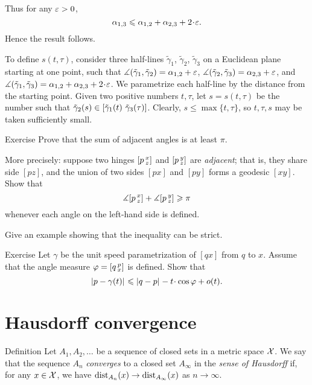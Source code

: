 Thus for any $\varepsilon>0$, 
\[\alpha_{1,3}\le \alpha_{1,2}+\alpha_{2,3}+2\cdot \eps.\]
Hence the result follows.

To define $s(t,\tau)$, consider three half-lines $\tilde \gamma_1$, $\tilde \gamma_2$, $\tilde \gamma_3$ on a Euclidean plane starting at one point, such that
$\measuredangle(\tilde \gamma_1,\tilde \gamma_2)=\alpha_{1,2}+\varepsilon$,
$\measuredangle(\tilde \gamma_2,\tilde \gamma_3)=\alpha_{2,3}+\varepsilon$,
and $\mangle(\tilde \gamma_1,\tilde \gamma_3)\z=\alpha_{1,2}\z+\alpha_{2,3}\z+2\cdot \eps$.
We parametrize each half-line by the distance from the starting point.
Given two positive numbers $t,\tau$, let $s=s(t,\tau)$ be
the number such that 
$\tilde \gamma_2(s)\in[\tilde \gamma_1(t)\ \tilde \gamma_3(\tau)]$. 
Clearly, $s\le\max\{t,\tau\}$, so $t,\tau,s$ may be taken sufficiently small.
\qeds 

\begin{thm}{Exercise}\label{ex:adjacent-angles}
Prove that the sum of adjacent angles is at least $\pi$.

More precisely: suppose two hinges $[p\,{}^{x}_{z}]$ and $[p\,{}^{y}_{z}]$ are \emph{adjacent};
that is, they share side $[pz]$, and the union of two sides $[px]$ and $[py]$ forms a geodesic $[xy]$.
Show that
\[\measuredangle[p\,{}^{x}_{z}]+\measuredangle[p\,{}^{y}_{z}]\geqslant \pi\]
whenever  each angle on the left-hand side is defined.

Give an example showing that the inequality can be strict.
\end{thm}

\begin{thm}{Exercise}\label{ex:first-var}
Let $\gamma$ be the unit speed parametrization of $[qx]$ from $q$ to $x$.
Assume that the angle measure $\varphi=[q\,{}^{p}_{x}]$ is defined.
Show that
\[\dist{p}{\gamma(t)}{}
\le
\dist{q}{p}{}-t\cdot \cos\phi+o(t).\]

\end{thm}

\section{Hausdorff convergence}\label{sec:Hausdorff convergence}

\begin{thm}{Definition}\label{def:gen-Haus-conv}
Let $A_1,A_2,\dots$ be a sequence of closed sets in a metric space $\mathcal{X}$.
We say that the sequence $A_n$ \emph{converges} to a closed set $A_\infty$ in the {}\emph{sense of Hausdorff} if, for any $x\in\mathcal{X}$, we have
$\mathrm{dist}_{A_n}(x)\to \mathrm{dist}_{A_\infty}(x)$ as $n\to\infty$.
\end{thm}

